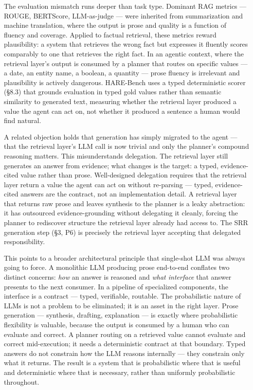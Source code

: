 \documentclass[
]{article}
\begin{document}
The evaluation mismatch runs deeper than task type. Dominant RAG metrics
--- ROUGE, BERTScore, LLM-as-judge --- were inherited from summarization
and machine translation, where the output is prose and quality is a
function of fluency and coverage. Applied to factual retrieval, these
metrics reward plausibility: a system that retrieves the wrong fact but
expresses it fluently scores comparably to one that retrieves the right
fact. In an agentic context, where the retrieval layer's output is
consumed by a planner that routes on specific values --- a date, an
entity name, a boolean, a quantity --- prose fluency is irrelevant and
plausibility is actively dangerous. HARE-Bench uses a typed
deterministic scorer (§8.3) that grounds evaluation in typed gold values
rather than semantic similarity to generated text, measuring whether the
retrieval layer produced a value the agent can act on, not whether it
produced a sentence a human would find natural.

A related objection holds that generation has simply migrated to the
agent --- that the retrieval layer's LLM call is now trivial and only
the planner's compound reasoning matters. This misunderstands
delegation. The retrieval layer still generates an answer from evidence;
what changes is the target: a typed, evidence-cited value rather than
prose. Well-designed delegation requires that the retrieval layer return
a value the agent can act on without re-parsing --- typed,
evidence-cited answers are the contract, not an implementation detail. A
retrieval layer that returns raw prose and leaves synthesis to the
planner is a leaky abstraction: it has outsourced evidence-grounding
without delegating it cleanly, forcing the planner to rediscover
structure the retrieval layer already had access to. The SRR generation
step (§3, P6) is precisely the retrieval layer accepting that delegated
responsibility.

This points to a broader architectural principle that single-shot LLM
was always going to force. A monolithic LLM producing prose end-to-end
conflates two distinct concerns: \emph{how} an answer is reasoned and
\emph{what interface} that answer presents to the next consumer. In a
pipeline of specialized components, the interface is a contract ---
typed, verifiable, routable. The probabilistic nature of LLMs is not a
problem to be eliminated; it is an asset in the right layer. Prose
generation --- synthesis, drafting, explanation --- is exactly where
probabilistic flexibility is valuable, because the output is consumed by
a human who can evaluate and correct. A planner routing on a retrieved
value cannot evaluate and correct mid-execution; it needs a
deterministic contract at that boundary. Typed answers do not constrain
how the LLM reasons internally --- they constrain only what it returns.
The result is a system that is probabilistic where that is useful and
deterministic where that is necessary, rather than uniformly
probabilistic throughout.
\end{document}
